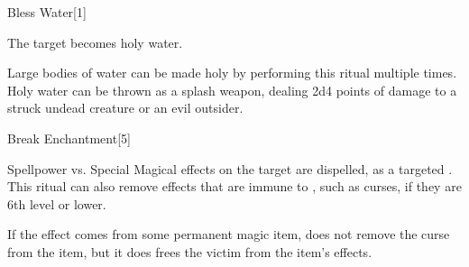 \begin{spellsection}{Bless Water}[1]
    \begin{spellheader}
    \end{spellheader}
    \begin{spellcontent}
        \begin{spelltargetinginfo}
        \end{spelltargetinginfo}
        \begin{spelleffects}

            \spelleffect The target becomes holy water.
        \end{spelleffects}
    \end{spellcontent}
    \begin{spellfooter}
        \spellnotes Large bodies of water can be made holy by performing this ritual multiple times. Holy water can be thrown as a splash weapon, dealing 2d4 points of damage to a struck undead creature or an evil outsider.
    \end{spellfooter}
\end{spellsection}

\begin{spellsection}{Break Enchantment}[5]
    \begin{spellheader}
    \end{spellheader}
    \begin{spellcontent}
        \begin{spelltargetinginfo}
            \spellrng{\rngclose}
        \end{spelltargetinginfo}
        \begin{spelleffects}

            \begin{spellattack}{Spellpower vs. Special}
                \spelleffect Magical effects on the target are dispelled, as a targeted . This ritual can also remove effects that are immune to , such as curses, if they are 6th level or lower.
            \end{spellattack}
            \par If the effect comes from some permanent magic item,  does not remove the curse from the item, but it does frees the victim from the item's effects.
        \end{spelleffects}
    \end{spellcontent}
    \begin{spellfooter}
    \end{spellfooter}
\end{spellsection}


